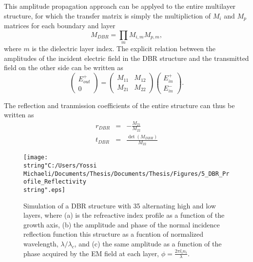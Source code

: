 This amplitude propagation approach can be applyed to the entire multilayer
structure, for which the transfer matrix is simply the multipliction
of $M_{i}$ and $M_{p}$ matrices for each boundary and layer\begin{equation}
M_{DBR}=\prod_{m}M_{i,m}M_{p,m},\end{equation}
where $m$ is the dielectric layer index. The explicit relation between
the amplitudes of the incident electric field in the DBR structure
and the transmitted field on the other side can be written as \begin{equation}
\left(\begin{array}{c}
E_{out}^{+}\\
0\end{array}\right)=\left(\begin{array}{cc}
M_{11} & M_{12}\\
M_{21} & M_{22}\end{array}\right)\left(\begin{array}{c}
E_{in}^{+}\\
E_{in}^{-}\end{array}\right).\end{equation}


The reflection and tranmission coefficients of the entire structure
can thus be written as\begin{eqnarray}
r_{DBR} & = & -\frac{M_{21}}{M_{22}}\\
t_{DBR} & = & \frac{\det(M_{DBR})}{M_{22}}\end{eqnarray}


%
\begin{figure}
\begin{centering}
\texttt{[image: \\string"C:/Users/Yossi Michaeli/Documents/Thesis/Documents/Thesis/Figures/5\_DBR\_Profile\_Reflectivity\\string".eps]}
\par\end{centering}

\caption{\label{fig:Sample_DBR_reflection}Simulation of a DBR structure with
35 alternating high and low layers, where (a) is the refreactive index
profile as a function of the growth axis, (b) the amplitude and phase
of the normal incidence reflection function this structure as a fucntion
of normalized wavelength, $\lambda/\lambda_{c}$, and (c) the same
amplitude as a function of the phase acquired by the EM field at each
layer, $\phi=\frac{2\pi l_{i}n_{i}}{\lambda}$.}

\end{figure}


